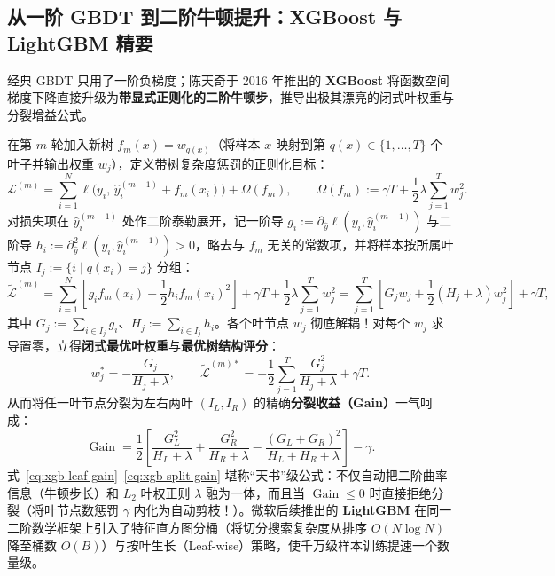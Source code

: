 \subsection{从一阶 GBDT 到二阶牛顿提升：XGBoost 与 LightGBM 精要}

经典 GBDT 只用了一阶负梯度；陈天奇于 2016 年推出的 \textbf{XGBoost} 将函数空间梯度下降直接升级为\textbf{带显式正则化的二阶牛顿步}，推导出极其漂亮的闭式叶权重与分裂增益公式。

在第 $m$ 轮加入新树 $f_m(x) = w_{q(x)}$（将样本 $x$ 映射到第 $q(x) \in \{1,\dots,T\}$ 个叶子并输出权重 $w_j$），定义带树复杂度惩罚的正则化目标：
\[
  \mathcal{L}^{(m)} = \sum_{i=1}^{N} \ell\!\big(y_i,\, \hat{y}_i^{(m-1)} + f_m(x_i)\big) + \Omega(f_m),
  \qquad \Omega(f_m) := \gamma T + \frac{1}{2}\lambda \sum_{j=1}^{T} w_j^2.
\]
对损失项在 $\hat{y}_i^{(m-1)}$ 处作二阶泰勒展开，记一阶导 $g_i := \partial_{\hat{y}}\ell(y_i, \hat{y}_i^{(m-1)})$ 与二阶导 $h_i := \partial_{\hat{y}}^2\ell(y_i, \hat{y}_i^{(m-1)}) > 0$，略去与 $f_m$ 无关的常数项，并将样本按所属叶节点 $I_j := \{i \mid q(x_i) = j\}$ 分组：
\[
  \widetilde{\mathcal{L}}^{(m)}
  = \sum_{i=1}^{N}\!\left[g_i f_m(x_i) + \frac{1}{2} h_i f_m(x_i)^2\right] + \gamma T + \frac{1}{2}\lambda \sum_{j=1}^{T} w_j^2
  = \sum_{j=1}^{T}\!\left[G_j w_j + \frac{1}{2}(H_j + \lambda) w_j^2\right] + \gamma T,
\]
其中 $G_j := \sum_{i \in I_j} g_i$、$H_j := \sum_{i \in I_j} h_i$。各个叶节点 $w_j$ 彻底解耦！对每个 $w_j$ 求导置零，立得\textbf{闭式最优叶权重}与\textbf{最优树结构评分}：
\begin{equation}\label{eq:xgb-leaf-gain}
  w_j^* = -\frac{G_j}{H_j + \lambda}, \qquad
  \widetilde{\mathcal{L}}^{(m)*} = -\frac{1}{2}\sum_{j=1}^{T} \frac{G_j^2}{H_j + \lambda} + \gamma T.
\end{equation}
从而将任一叶节点分裂为左右两叶 $(I_L, I_R)$ 的精确\textbf{分裂收益（Gain）}一气呵成：
\begin{equation}\label{eq:xgb-split-gain}
  \operatorname{Gain} = \frac{1}{2}\left[\frac{G_L^2}{H_L + \lambda} + \frac{G_R^2}{H_R + \lambda} - \frac{(G_L + G_R)^2}{H_L + H_R + \lambda}\right] - \gamma.
\end{equation}
式~\eqref{eq:xgb-leaf-gain}--\eqref{eq:xgb-split-gain} 堪称“天书”级公式：不仅自动把二阶曲率信息（牛顿步长）和 $L_2$ 叶权正则 $\lambda$ 融为一体，而且当 $\operatorname{Gain} \le 0$ 时直接拒绝分裂（将叶节点数惩罚 $\gamma$ 内化为自动剪枝！）。微软后续推出的 \textbf{LightGBM} 在同一二阶数学框架上引入了特征直方图分桶（将切分搜索复杂度从排序 $O(N\log N)$ 降至桶数 $O(B)$）与按叶生长（Leaf-wise）策略，使千万级样本训练提速一个数量级。


